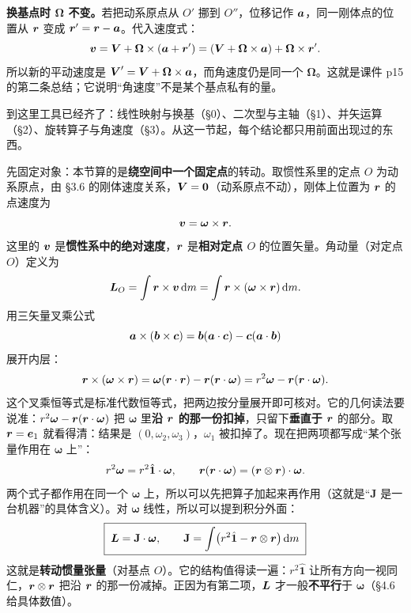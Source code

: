 \documentclass[11pt]{ctexart}
\newcommand{\ten}[1]{\mathbf{#1}}
\newcommand{\unitd}{\hat{\ten{1}}}
\let\orighdr\hdr
\renewcommand{\hdr}[2]{\par\needspace{10\baselineskip}\orighdr{#1}{#2}}
\let\origsubhdr\subhdr
\renewcommand{\subhdr}[1]{\par\needspace{3\baselineskip}\origsubhdr{#1}}
\begin{document}
\textbf{换基点时 $\boldsymbol\Omega$ 不变。}若把动系原点从 $O'$ 挪到 $O''$，位移记作 $\boldsymbol{a}$，同一刚体点的位置从 $\boldsymbol{r}$ 变成 $\boldsymbol{r}'=\boldsymbol{r}-\boldsymbol{a}$。代入速度式：
\[
\boldsymbol{v}=\boldsymbol{V}+\boldsymbol\Omega\times(\boldsymbol{a}+\boldsymbol{r}')
=(\boldsymbol{V}+\boldsymbol\Omega\times\boldsymbol{a})+\boldsymbol\Omega\times\boldsymbol{r}' .
\]
所以新的平动速度是 $\boldsymbol{V}'=\boldsymbol{V}+\boldsymbol\Omega\times\boldsymbol{a}$，而角速度仍是同一个 $\boldsymbol\Omega$。这就是课件 p15 的第二条总结；它说明“角速度”不是某个基点私有的量。

\label{sec:inertia}

到这里工具已经齐了：线性映射与换基（\S0）、二次型与主轴（\S1）、并矢运算（\S2）、旋转算子与角速度（\S3）。从这一节起，每个结论都只用前面出现过的东西。

\label{subsec:inertia-construct}

先固定对象：本节算的是\textbf{绕空间中一个固定点}的转动。取惯性系里的定点 $O$ 为动系原点，由 \S3.6 的刚体速度关系，$\boldsymbol{V}=\boldsymbol{0}$（动系原点不动），刚体上位置为 $\boldsymbol{r}$ 的点速度为
\[
\boldsymbol{v}=\boldsymbol\omega\times\boldsymbol{r} .
\]
这里的 $\boldsymbol{v}$ 是\textbf{惯性系中的绝对速度}，$\boldsymbol{r}$ 是\textbf{相对定点 $O$} 的位置矢量。角动量（对定点 $O$）定义为
\[
\boldsymbol{L}_O=\int\boldsymbol{r}\times\boldsymbol{v}\,\mathrm{d} m
=\int\boldsymbol{r}\times(\boldsymbol\omega\times\boldsymbol{r})\,\mathrm{d} m .
\]
用三矢量叉乘公式
\[
\boldsymbol{a}\times(\boldsymbol{b}\times\boldsymbol{c})=\boldsymbol{b}(\boldsymbol{a}\cdot\boldsymbol{c})-\boldsymbol{c}(\boldsymbol{a}\cdot\boldsymbol{b})
\]
展开内层：
\[
\boldsymbol{r}\times(\boldsymbol\omega\times\boldsymbol{r})
=\boldsymbol\omega(\boldsymbol{r}\cdot\boldsymbol{r})-\boldsymbol{r}(\boldsymbol{r}\cdot\boldsymbol\omega)
=r^2\boldsymbol\omega-\boldsymbol{r}(\boldsymbol{r}\cdot\boldsymbol\omega).
\]
这个叉乘恒等式是标准代数恒等式，把两边按分量展开即可核对。它的几何读法要说准：$r^2\boldsymbol\omega-\boldsymbol{r}(\boldsymbol{r}\cdot\boldsymbol\omega)$ 把 $\boldsymbol\omega$ 里\textbf{沿 $\boldsymbol{r}$ 的那一份扣掉}，只留下\textbf{垂直于 $\boldsymbol{r}$} 的部分。取 $\boldsymbol{r}=\boldsymbol{e}_1$ 就看得清：结果是 $(0,\omega_2,\omega_3)$，$\omega_1$ 被扣掉了。现在把两项都写成“某个张量作用在 $\boldsymbol\omega$ 上”：
\[
r^2\boldsymbol\omega=r^2\unitd\cdot\boldsymbol\omega,
\qquad
\vect r(\vect r\cdot\boldsymbol\omega)=(\vect r\otimes\vect r)\cdot\boldsymbol\omega .
\]
两个式子都作用在同一个 $\boldsymbol\omega$ 上，所以可以先把算子加起来再作用（这就是“$\ten J$ 是一台机器”的具体含义）。对 $\boldsymbol\omega$ 线性，所以可以提到积分外面：
\[
\boxed{\;\vect L=\ten J\cdot\boldsymbol\omega,\qquad
\ten J=\int\bigl(r^2\unitd-\vect r\otimes\vect r\bigr)\dd m\;}
\]
这就是\textbf{转动惯量张量}（对基点 $O$）。它的结构值得读一遍：$r^2\unitd$ 让所有方向一视同仁，$\boldsymbol{r}\otimes\boldsymbol{r}$ 把沿 $\boldsymbol{r}$ 的那一份减掉。正因为有第二项，$\boldsymbol{L}$ 才一般\textbf{不平行}于 $\boldsymbol\omega$（\S4.6 给具体数值）。
\end{document}
